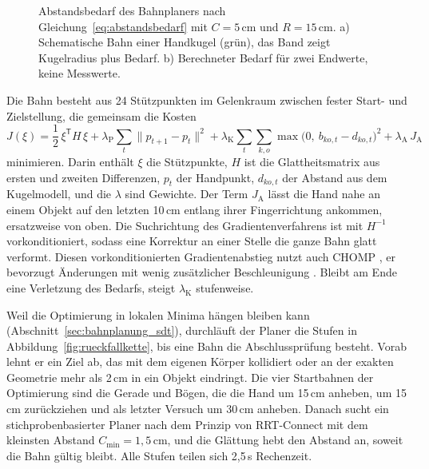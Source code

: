 \begin{figure}[htbp]
  \centering
  
  \caption[Trichter des Bahnplaners]{Abstandsbedarf des Bahnplaners nach Gleichung~\ref{eq:abstandsbedarf} mit $C = 5$\,cm und $R = 15$\,cm. a) Schematische Bahn einer Handkugel (grün), das Band zeigt Kugelradius plus Bedarf. b) Berechneter Bedarf für zwei Endwerte, keine Messwerte.}
  \label{fig:trichter}
\end{figure}

Die Bahn besteht aus 24 Stützpunkten im Gelenkraum zwischen fester Start- und Zielstellung, die gemeinsam die Kosten
\begin{equation}
  J(\xi) = \frac{1}{2}\,\xi^\mathsf{T} H\,\xi
  + \lambda_\mathrm{P} \sum_{t} \| p_{t+1} - p_t \|^2
  + \lambda_\mathrm{K} \sum_{t} \sum_{k,o} \max\bigl(0,\ b_{ko,t} - d_{ko,t}\bigr)^2
  + \lambda_\mathrm{A}\, J_\mathrm{A}
  \label{eq:planerkosten}
\end{equation}
%
minimieren.
Darin enthält $\xi$ die Stützpunkte, $H$ ist die Glattheitsmatrix aus ersten und zweiten Differenzen, $p_t$ der Handpunkt, $d_{ko,t}$ der Abstand aus dem Kugelmodell, und die $\lambda$ sind Gewichte.
Der Term $J_\mathrm{A}$ lässt die Hand nahe an einem Objekt auf den letzten 10\,cm entlang ihrer Fingerrichtung ankommen, ersatzweise von oben.
Die Suchrichtung des Gradientenverfahrens ist mit $H^{-1}$ vorkonditioniert, sodass eine Korrektur an einer Stelle die ganze Bahn glatt verformt.
Diesen vorkonditionierten Gradientenabstieg nutzt auch CHOMP \cite{Schulman2014}, er bevorzugt Änderungen mit wenig zusätzlicher Beschleunigung \cite{Zucker2013}.
Bleibt am Ende eine Verletzung des Bedarfs, steigt $\lambda_\mathrm{K}$ stufenweise.

Weil die Optimierung in lokalen Minima hängen bleiben kann (Abschnitt~\ref{sec:bahnplanung_sdt}), durchläuft der Planer die Stufen in Abbildung~\ref{fig:rueckfallkette}, bis eine Bahn die Abschlussprüfung besteht.
Vorab lehnt er ein Ziel ab, das mit dem eigenen Körper kollidiert oder an der exakten Geometrie mehr als 2\,cm in ein Objekt eindringt.
Die vier Startbahnen der Optimierung sind die Gerade und Bögen, die die Hand um 15\,cm anheben, um 15\,cm zurückziehen und als letzter Versuch um 30\,cm anheben.
Danach sucht ein stichprobenbasierter Planer nach dem Prinzip von RRT-Connect \cite{Kuffner2000} mit dem kleinsten Abstand $C_\mathrm{min} = 1{,}5$\,cm, und die Glättung hebt den Abstand an, soweit die Bahn gültig bleibt.
Alle Stufen teilen sich 2,5\,s Rechenzeit.

